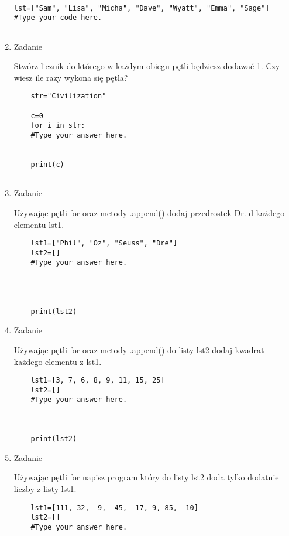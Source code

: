 \documentclass[11pt]{article}
\begin{document}
\begin{enumerate}
\begin{lstlisting}
	
lst=["Sam", "Lisa", "Micha", "Dave", "Wyatt", "Emma", "Sage"]
#Type your code here.
	
\end{lstlisting}

\item 
\begin{Large}
	Zadanie
\end{Large}
\par
Stwórz licznik do którego w każdym obiegu pętli będziesz dodawać 1. Czy wiesz ile razy wykona się pętla?
\begin{lstlisting}
	str="Civilization"
	
	c=0
	for i in str:
	#Type your answer here.    
	
	
	print(c)
	
\end{lstlisting}

\item 
\begin{Large}
	Zadanie
\end{Large}
\par
Używając pętli for oraz metody .append() dodaj przedrostek Dr. d każdego elementu lst1.
\begin{lstlisting}
	lst1=["Phil", "Oz", "Seuss", "Dre"]
	lst2=[]
	#Type your answer here.
	
	
	
	
	print(lst2)
\end{lstlisting}

\item 
\begin{Large}
	Zadanie
\end{Large}
\par
Używając pętli for oraz metody .append() do listy lst2 dodaj kwadrat każdego elementu z lst1.
\begin{lstlisting}
	lst1=[3, 7, 6, 8, 9, 11, 15, 25]
	lst2=[]
	#Type your answer here.
	
	
	
	print(lst2)
\end{lstlisting}

\item 
\begin{Large}
	Zadanie
\end{Large}
\par
Używając pętli for napisz program który do listy lst2 doda tylko dodatnie liczby z listy lst1.
\begin{lstlisting}
	lst1=[111, 32, -9, -45, -17, 9, 85, -10]
	lst2=[]
	#Type your answer here.
	

\end{lstlisting}
\end{enumerate}
\end{document}
